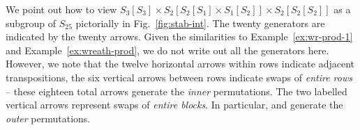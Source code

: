 \documentclass[ALCO, Unicode]{cedram}
\begin{document}
\begin{exam}\label{ex:stab-subgroup} We point out how to view $S_{3}[S_3]\times S_2\left[S_2[S_1] \times S_1[S_2]\right] \times S_2\left[S_2[S_2]\right]$ as a subgroup of $S_{25}$ pictorially in Fig.~\ref{fig:stab-int}. The twenty generators are indicated by the twenty arrows. Given the similarities to Example~\ref{ex:wr-prod-1} and Example~\ref{ex:wreath-prod}, we do not write out all the generators here. However, we note that the twelve horizontal arrows within rows indicate adjacent transpositions, the six vertical arrows between rows indicate swaps of \textit{entire rows} -- these eighteen total arrows generate the \textit{inner} permutations. The two labelled vertical arrows represent swaps of \textit{entire blocks}. In particular,  \color{teal}{$q = (10, 14)(11, 15)(12,16)(13,17)$} \normalcolor and \color{teal}{$r = (18, 22)(19, 23)(20, 24)(21,25)$} \color{black}{} generate the \textit{outer} permutations. \normalcolor

 \begin{figure}[ht]
 \normalcolor

    \centering
\def\thickhline{\noalign{\hrule height 4pt}}


\end{figure}
\end{exam}
\end{document}
